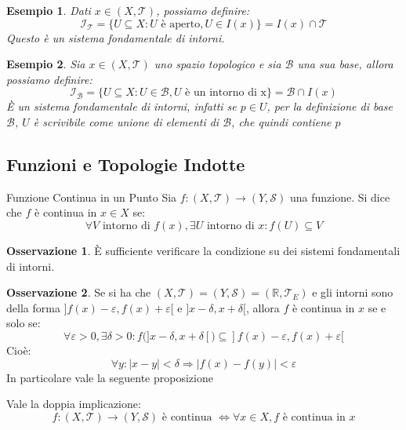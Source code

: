 \documentclass[11pt,a4paper,twoside]{article}
\newtheorem{es}{Esempio}
\theoremstyle{definition}
\newtheorem*{oss}{Osservazione}
\begin{document}
\begin{es}
	Dati $x \in (X, \mathcal T)$, possiamo definire:
	\[\mathcal I_\mathcal T = \{U \subseteq X: U\text{ è aperto}, U \in I(x)\} = I(x) \cap \mathcal T\]
	Questo è un sistema fondamentale di intorni.
\end{es}

\begin{es}
	Sia $x \in(X, \mathcal T)$ uno spazio topologico e sia $\mathcal B$ una sua base, allora possiamo definire:
	\[\mathcal I_\mathcal B = \{U \subseteq X: U \in \mathcal B, U \text{ è un intorno di x}\} = \mathcal B \cap I(x)\]
	È un sistema fondamentale di intorni, infatti se $p \in U$, per la definizione di base $\mathcal B$, $U$ è scrivibile come unione di elementi di $\mathcal B$, che quindi contiene $p$
\end{es}

\subsection{Funzioni e Topologie Indotte}

\begin{defn}{Funzione Continua in un Punto}{}
	Sia $f \colon (X, \mathcal T) \to (Y, \mathcal S)$ una funzione. Si dice che $f$ è continua in $x \in X$ se:
	\[\forall V \text{ intorno di }f(x), \exists U \text{ intorno di }x: f(U)\subseteq V\]
\end{defn}

\begin{oss}
	È sufficiente verificare la condizione su dei sistemi fondamentali di intorni.
\end{oss}

\begin{oss}
	Se si ha che $(X, \mathcal T) = (Y, \mathcal S) = (\mathbb R, \mathcal T_E)$ e gli intorni sono della forma $]f(x)-\varepsilon, f(x)+\varepsilon[$ e $]x-\delta, x + \delta[$, allora $f$ è continua in $x$ se e solo se:
	\[ \forall \varepsilon > 0, \exists \delta >0: f{\big (}]x-\delta, x+\delta[{\big )} \subseteq ]f(x)-\varepsilon, f(x)+\varepsilon[\]
	Cioè:
	\[\forall y: |x-y|<\delta \Rightarrow |f(x)-f(y)|<\varepsilon\]
	In particolare vale la seguente proposizione
\end{oss}

\begin{prop}{}{}
	Vale la doppia implicazione:
	\[ f\colon(X, \mathcal T) \to (Y, \mathcal S) \text{ è continua }\Leftrightarrow \forall x \in X, f \text{ è continua in }x \]
\end{prop}
\end{document}
